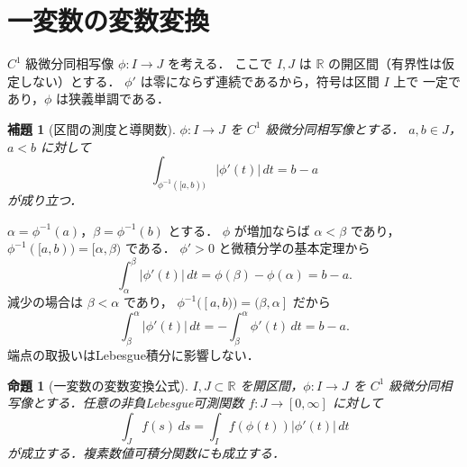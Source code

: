 \documentclass[a5paper,10pt,onecolumn]{jsarticle}
\makeatletter
\theoremstyle{mathnotetheorem}
\newtheorem{lemma}[theorem]{補題}
\newtheorem{proposition}[theorem]{命題}
\renewcommand{\proofname}{証明}
\renewenvironment{proof}[1][\proofname]{%
  \par\pushQED{\qed}\normalfont\topsep4\p@\@plus2\p@\relax
  \trivlist\item[\hskip\labelsep\bfseries #1]\ignorespaces
}{\popQED\endtrivlist\@endpefalse}
\newcommand{\R}{\mathbb{R}}
\newcommand{\abs}[1]{\lvert #1\rvert}
\makeatother
\begin{document}
\section{一変数の変数変換}

$C^1$ 級微分同相写像 $\phi:I\to J$ を考える．
ここで $I,J$ は $\R$ の開区間（有界性は仮定しない）とする．
$\phi'$ は零にならず連続であるから，符号は区間 $I$ 上で
一定であり，$\phi$ は狭義単調である．

\begin{lemma}[区間の測度と導関数]\label{lem:oneinterval}
$\phi:I\to J$ を $C^1$ 級微分同相写像とする．
$a,b\in J$，$a<b$ に対して
\[
 \int_{\phi^{-1}([a,b))}\abs{\phi'(t)}\,dt=b-a
\]
が成り立つ．
\end{lemma}

\begin{proof}
$\alpha=\phi^{-1}(a)$，$\beta=\phi^{-1}(b)$ とする．
$\phi$ が増加ならば $\alpha<\beta$ であり，
$\phi^{-1}([a,b))=[\alpha,\beta)$ である．
$\phi'>0$ と微積分学の基本定理から
\[
 \int_{\alpha}^{\beta}\abs{\phi'(t)}\,dt
 =\phi(\beta)-\phi(\alpha)=b-a.
\]
減少の場合は $\beta<\alpha$ であり，
$\phi^{-1}([a,b))=(\beta,\alpha]$ だから
\[
 \int_{\beta}^{\alpha}\abs{\phi'(t)}\,dt
 =-\int_{\beta}^{\alpha}\phi'(t)\,dt=b-a.
\]
端点の取扱いはLebesgue積分に影響しない．
\end{proof}

\begin{proposition}[一変数の変数変換公式]\label{prop:onevar}
$I,J\subset\R$ を開区間，$\phi:I\to J$ を
$C^1$ 級微分同相写像とする．任意の非負Lebesgue可測関数
$f:J\to[0,\infty]$ に対して
\begin{equation}\label{eq:onevar}
 \int_J f(s)\,ds
 =\int_I f(\phi(t))\abs{\phi'(t)}\,dt
\end{equation}
が成立する．複素数値可積分関数にも成立する．
\end{proposition}
\end{document}
